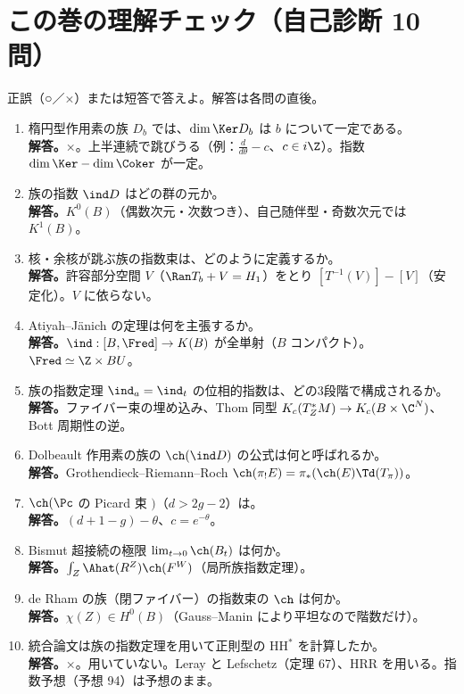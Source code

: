 
\section{この巻の理解チェック（自己診断 10 問）}\label{sec:check}
正誤（○／×）または短答で答えよ。解答は各問の直後。
\begin{enumerate}
\item 楕円型作用素の族 $D_b$ では、$\dim\Ker D_b$ は $b$ について一定である。\\
\textbf{解答。}×。上半連続で跳びうる（例：$\frac d{d\theta}-c$、$c\in i\Z$）。指数 $\dim\Ker-\dim\Coker$ が一定。
\item 族の指数 $\ind D$ はどの群の元か。\\
\textbf{解答。}$K^0(B)$（偶数次元・次数つき）、自己随伴型・奇数次元では $K^1(B)$。
\item 核・余核が跳ぶ族の指数束は、どのように定義するか。\\
\textbf{解答。}許容部分空間 $V$（$\Ran T_b+V=H_1$）をとり $[T^{-1}(V)]-[V]$（安定化）。$V$ に依らない。
\item Atiyah--J\"anich の定理は何を主張するか。\\
\textbf{解答。}$\ind:[B,\Fred]\to K(B)$ が全単射（$B$ コンパクト）。$\Fred\simeq\Z\times BU$。
\item 族の指数定理 $\ind_a=\ind_t$ の位相的指数は、どの3段階で構成されるか。\\
\textbf{解答。}ファイバー束の埋め込み、Thom 同型 $K_c(T^*_ZM)\to K_c(B\times\C^N)$、Bott 周期性の逆。
\item Dolbeault 作用素の族の $\ch(\ind D)$ の公式は何と呼ばれるか。\\
\textbf{解答。}Grothendieck--Riemann--Roch $\ch(\pi_!E)=\pi_*(\ch(E)\Td(T_\pi))$。
\item $\ch(\Pc$ の Picard 束 $)$（$d>2g-2$）は。\\
\textbf{解答。}$(d+1-g)-\theta$、$c=e^{-\theta}$。
\item Bismut 超接続の極限 $\lim_{t\to0}\ch(B_t)$ は何か。\\
\textbf{解答。}$\int_Z\Ahat(R^Z)\ch(F^W)$（局所族指数定理）。
\item de Rham の族（閉ファイバー）の指数束の $\ch$ は何か。\\
\textbf{解答。}$\chi(Z)\in H^0(B)$（Gauss--Manin により平坦なので階数だけ）。
\item 統合論文は族の指数定理を用いて正則型の $\mathrm{HH}^*$ を計算したか。\\
\textbf{解答。}×。用いていない。Leray と Lefschetz（定理 67）、HRR を用いる。指数予想（予想 94）は予想のまま。
\end{enumerate}

